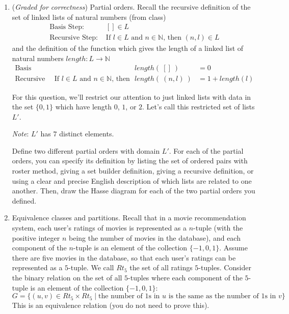 \documentclass[12pt, oneside]{article}
\newcommand{\gradeCorrect}{({\it Graded for correctness}) }
\begin{document}
\begin{enumerate}[labelindent=0pt, leftmargin=0pt]
    \item\gradeCorrect Partial orders. Recall the recursive definition of the set of linked lists of 
    natural numbers (from class)
    \[
    \begin{array}{ll}
        \textrm{Basis Step: } & [] \in L \\
        \textrm{Recursive Step: } & \textrm{If } l \in L\textrm{ and }n \in \mathbb{N} \textrm{, then } (n, l) \in L
    \end{array}
    \]
    and the definition of the function which gives the length of a linked list of natural numbers 
    $length: L \to \mathbb{N}$
        \[
        \begin{array}{llll}
            \textrm{Basis Step:} &  & length(~[]~) &= 0 \\
            \textrm{Recursive Step:} & \textrm{If } l \in L\textrm{ and }n \in \mathbb{N}\textrm{, then  } & length(~(n, l)~)  &= 1+ length(l)
        \end{array}
         \]
     
    For this question, we'll restrict our attention to just linked lists with data in the set $\{0,1\}$
    which have length $0$, $1$, or $2$. Let's call this restricted set of lists $L'$.
    
    {\it Note}: $L'$ has $7$ distinct elements.

    Define two different partial orders with domain $L'$. For each of the partial orders, you  can specify its definition by
    listing the set of ordered pairs with roster method, giving a set builder
    definition, giving a recursive definition, or using a clear and precise English description of which lists are related to one another.
    Then, draw the Hasse diagram for each of the two partial orders you defined.


    \item Equivalence classes and partitions. 
    Recall that 
    in a movie recommendation system, each 
    user's ratings of movies is represented as a $n$-tuple (with the positive integer $n$ 
    being the number of movies in the database), and each component of 
    the $n$-tuple is an element of the collection $\{-1,0,1\}$. Assume there are five movies in the database, 
    so that each user's ratings
    can be represented as a $5$-tuple. We call $Rt_5$ the set of all ratings $5$-tuples.
    Consider the binary relation on the  set of all 
    $5$-tuples where each  component of the $5$-tuple is an element of the collection $\{-1,0,1\}$:
    \[
        G = \{ (u,v) \in Rt_5 \times Rt_5 \mid \text{the number of $1$s in $u$ is the same as the number of $1$s in $v$} \}
    \]
    This is an equivalence relation (you do not need to prove this).


\end{enumerate}
\end{document}
